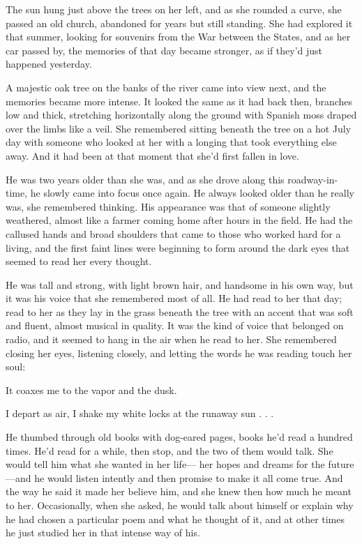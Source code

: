 \documentclass[10pt, twoside, openright]{book}
\begin{document}
The sun hung just above the trees on her left, and as she rounded a
curve, she passed an old church, abandoned for years but still standing.
She had explored it that summer, looking for souvenirs from the War
between the States, and as her car passed by, the memories of that day
became stronger, as if they'd just happened yesterday.

A majestic oak tree on the banks of the river came into view next, and
the memories became more intense. It looked the same as it had back
then, branches low and thick, stretching horizontally along the ground
with Spanish moss draped over the limbs like a veil. She remembered
sitting beneath the tree on a hot July day with someone who looked at
her with a longing that took everything else away. And it had been at
that moment that she'd first fallen in love.

He was two years older than she was, and as she drove along this
roadway-in-time, he slowly came into focus once again. He always looked
older than he really was, she remembered thinking. His appearance was
that of someone slightly weathered, almost like a farmer coming home
after hours in the field. He had the callused hands and broad shoulders
that came to those who worked hard for a living, and the first faint
lines were beginning to form around the dark eyes that seemed to read
her every thought.

He was tall and strong, with light brown hair, and handsome in his own
way, but it was his voice that she remembered most of all. He had read
to her that day; read to her as they lay in the grass beneath the tree
with an accent that was soft and fluent, almost musical in quality. It
was the kind of voice that belonged on radio, and it seemed to hang in
the air when he read to her. She remembered closing her eyes, listening
closely, and letting the words he was reading touch her soul:


It coaxes me to the vapor and the dusk.

I depart as air, I shake my white locks at the runaway sun . . .


He thumbed through old books with dog-eared pages, books he'd read a
hundred times. He'd read for a while, then stop, and the two of them
would talk. She would tell him what she wanted in her life--- her hopes
and dreams for the future---and he would listen intently and then
promise to make it all come true. And the way he said it made her
believe him, and she knew then how much he meant to her. Occasionally,
when she asked, he would talk about himself or explain why he had chosen
a particular poem and what he thought of it, and at other times he just
studied her in that intense way of his.
\end{document}
